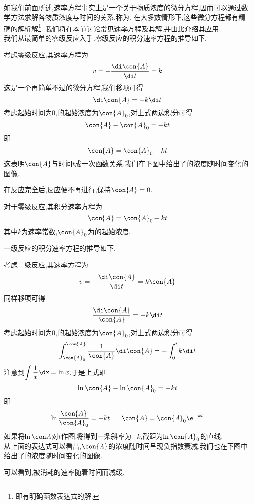 \documentclass{ctexart}
\begin{document}
\pagestyle{plain}
\noindent{}\vspace{15pt}\\
\indent 如我们前面所述,速率方程事实上是一个关于物质浓度的微分方程,因而可以通过数学方法求解各物质浓度与时间的关系,称为.%
在大多数情形下,这些微分方程都有精确的解析解\footnote{即有明确函数表达式的解.}.%
我们将在本节讨论常见速率方程及其解,并由此介绍其应用.\vspace{12pt}\\
\indent 我们从最简单的零级反应入手.零级反应的积分速率方程的推导如下.
\begin{derivation}
    考虑零级反应,其速率方程为
    \[v=-\dfrac{\di\con{A}}{\di t}=k\]
    这是一个再简单不过的微分方程,我们移项可得
    \[\di\con{A}=-k\di t\]
    考虑起始时间为$0$,的起始浓度为$\con{A}_0$,对上式两边积分可得
    \[\con{A}-\con{A}_0=-kt\]
    即
    \[\con{A}=\con{A}_0-kt\]
    这表明$\con{A}$与时间$t$成一次函数关系.我们在下图中给出了的浓度随时间变化的图像.
    \begin{tightcenter}
        
    \end{tightcenter}
    在反应完全后,反应便不再进行,保持$\con{A}=0$.
\end{derivation}
\begin{theorem}[7B.1.1 零级反应的积分速率方程]
    对于零级反应,其积分速率方程为
    \[\con{A}=\con{A}_0-kt\]
    其中$k$为速率常数,$\con{A}_0$为的起始浓度.
\end{theorem}
\indent 一级反应的积分速率方程的推导如下.
\begin{derivation}
    考虑一级反应,其速率方程为
    \[v=-\dfrac{\di\con{A}}{\di t}=k\con{A}\]
    同样移项可得
    \[\dfrac{\di\con{A}}{\con{A}}=-k\di t\]
    考虑起始时间为$0$,的起始浓度为$\con{A}_0$,对上式两边积分可得
    \[\int_{\con{A}_0}^{\con{A}}\dfrac{1}{\con{A}}\di\con{A}=-\int_0^{t}k\di t\]
    注意到$\displaystyle\int \dfrac{1}{x}\dx=\ln x$,于是上式即
    \[\ln\con{A}-\ln\con{A}_0=-kt\]
    即
    \[\ln\dfrac{\con{A}}{\con{A}_0}=-kt\ \ \ \ \ \con{A}=\con{A}_0\e^{-kt}\]
    如果将$\ln\con A$对$t$作图,将得到一条斜率为$-k$,截距为$\ln\con{A}_0$的直线.\\
    从上面的表达式可以看出,$\con{A}$的浓度随时间呈现负指数衰减.我们也在下图中给出了的浓度随时间变化的图像.
    \begin{tightcenter}
        
    \end{tightcenter}
    可以看到,被消耗的速率随着时间而减缓.
\end{derivation}
\end{document}
